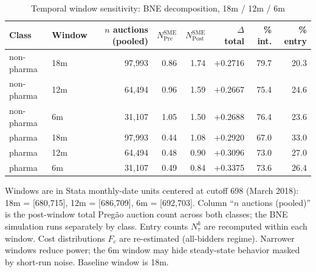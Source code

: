 \begin{table}[htbp]
\centering
\begin{threeparttable}
\caption{Temporal window sensitivity: BNE decomposition, 18m / 12m / 6m}
\label{tab:v3_window_sensitivity}
\small
\setlength{\tabcolsep}{4pt}
\begin{tabular}{llrrrrrr}
\toprule
Class & Window & $n$ auctions (pooled) & $N^{\text{SME}}_{\text{Pre}}$ & $N^{\text{SME}}_{\text{Post}}$ & $\Delta$ total & \% int. & \% entry \\
\midrule
non-pharma & 18m & 97,993 & 0.86 & 1.74 & +0.2716 & 79.7 & 20.3 \\
non-pharma & 12m & 64,494 & 0.96 & 1.59 & +0.2667 & 75.4 & 24.6 \\
non-pharma & 6m & 31,107 & 1.05 & 1.50 & +0.2688 & 76.4 & 23.6 \\
pharma & 18m & 97,993 & 0.44 & 1.08 & +0.2920 & 67.0 & 33.0 \\
pharma & 12m & 64,494 & 0.48 & 0.90 & +0.3096 & 73.0 & 27.0 \\
pharma & 6m & 31,107 & 0.49 & 0.84 & +0.3375 & 73.6 & 26.4 \\
\bottomrule
\end{tabular}
\begin{tablenotes}\footnotesize
\item Windows are in Stata monthly-date units centered at cutoff
698 (March 2018): 18m = [680,715], 12m = [686,709], 6m = [692,703].
Column ``$n$ auctions (pooled)'' is the post-window total Preg\~ao
auction count across both classes; the BNE simulation runs
separately by class. Entry counts $N^k_\tau$ are recomputed within
each window. Cost distributions $F_c$ are re-estimated (all-bidders
regime). Narrower windows reduce power; the 6m window may hide
steady-state behavior masked by short-run noise. Baseline window
is 18m.
\end{tablenotes}
\end{threeparttable}
\end{table}
